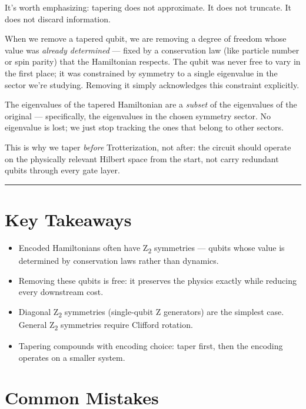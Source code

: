 \documentclass[
  11pt,
  oneside]{book}
\providecommand{\tightlist}{%
  \setlength{\itemsep}{0pt}\setlength{\parskip}{0pt}}
\begin{document}
It's worth emphasizing: tapering does not approximate. It does not
truncate. It does not discard information.

When we remove a tapered qubit, we are removing a degree of freedom
whose value was \emph{already determined} --- fixed by a conservation
law (like particle number or spin parity) that the Hamiltonian respects.
The qubit was never free to vary in the first place; it was constrained
by symmetry to a single eigenvalue in the sector we're studying.
Removing it simply acknowledges this constraint explicitly.

The eigenvalues of the tapered Hamiltonian are a \emph{subset} of the
eigenvalues of the original --- specifically, the eigenvalues in the
chosen symmetry sector. No eigenvalue is lost; we just stop tracking the
ones that belong to other sectors.

This is why we taper \emph{before} Trotterization, not after: the
circuit should operate on the physically relevant Hilbert space from the
start, not carry redundant qubits through every gate layer.

\begin{center}\rule{0.5\linewidth}{0.5pt}\end{center}

\section{Key Takeaways}\label{key-takeaways-9}

\begin{itemize}
\tightlist
\item
  Encoded Hamiltonians often have Z\textsubscript{2} symmetries --- qubits whose value
  is determined by conservation laws rather than dynamics.
\item
  Removing these qubits is free: it preserves the physics exactly while
  reducing every downstream cost.
\item
  Diagonal Z\textsubscript{2} symmetries (single-qubit Z generators) are the simplest
  case. General Z\textsubscript{2} symmetries require Clifford rotation.
\item
  Tapering compounds with encoding choice: taper first, then the
  encoding operates on a smaller system.
\end{itemize}

\section{Common Mistakes}\label{common-mistakes-8}
\end{document}
